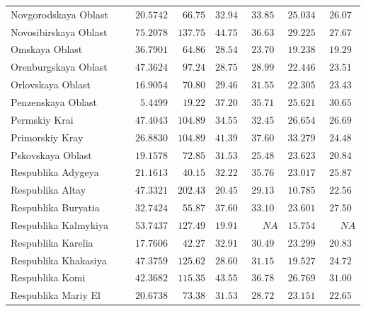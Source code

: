\documentclass[alpha-refs]{wiley-article-05g}
\begin{document}
{\begin{longtable}{lcccccc}
Novgorodskaya Oblast  & $\phantom{0}\phantom{-}20.5742$ & $\phantom{0}66.75$ & $32.94$ & $33.85$ & $25.034$ & $26.07$ \\
Novosibirskaya Oblast  & $\phantom{0}\phantom{-}75.2078$ & $137.75$ & $44.75$ & $36.63$ & $29.225$ & $27.67$ \\
Omskaya Oblast  & $\phantom{0}\phantom{-}36.7901$ & $\phantom{0}64.86$ & $28.54$ & $23.70$ & $19.238$ & $19.29$ \\
Orenburgskaya Oblast  & $\phantom{0}\phantom{-}47.3624$ & $\phantom{0}97.24$ & $28.75$ & $28.99$ & $22.446$ & $23.51$ \\
Orlovskaya Oblast  & $\phantom{0}\phantom{-}16.9054$ & $\phantom{0}70.80$ & $29.46$ & $31.55$ & $22.305$ & $23.43$ \\
Penzenskaya Oblast  & $\phantom{00}\phantom{-}5.4499$ & $\phantom{0}19.22$ & $37.20$ & $35.71$ & $25.621$ & $30.65$ \\
Permskiy Krai  & $\phantom{0}\phantom{-}47.4043$ & $104.89$ & $34.55$ & $32.45$ & $26.654$ & $26.69$ \\
Primorskiy Kray  & $\phantom{0}\phantom{-}26.8830$ & $104.89$ & $41.39$ & $37.60$ & $33.279$ & $24.48$ \\
Pskovskaya Oblast  & $\phantom{0}\phantom{-}19.1578$ & $\phantom{0}72.85$ & $31.53$ & $25.48$ & $23.623$ & $20.84$ \\
Respublika Adygeya  & $\phantom{0}\phantom{-}21.1613$ & $\phantom{0}40.15$ & $32.22$ & $35.76$ & $23.017$ & $25.87$ \\
Respublika Altay  & $\phantom{0}\phantom{-}47.3321$ & $202.43$ & $20.45$ & $29.13$ & $10.785$ & $22.56$ \\
Respublika Buryatia  & $\phantom{0}\phantom{-}32.7424$ & $\phantom{0}55.87$ & $37.60$ & $33.10$ & $23.601$ & $27.50$ \\
Respublika Kalmykiya  & $\phantom{0}\phantom{-}53.7437$ & $127.49$ & $19.91$ & $\phantom{000}NA$ & $15.754$ & $\phantom{000}NA$ \\
Respublika Karelia  & $\phantom{0}\phantom{-}17.7606$ & $\phantom{0}42.27$ & $32.91$ & $30.49$ & $23.299$ & $20.83$ \\
Respublika Khakasiya  & $\phantom{0}\phantom{-}47.3759$ & $125.62$ & $28.60$ & $31.15$ & $19.527$ & $24.72$ \\
Respublika Komi  & $\phantom{0}\phantom{-}42.3682$ & $115.35$ & $43.55$ & $36.78$ & $26.769$ & $31.00$ \\
Respublika Mariy El  & $\phantom{0}\phantom{-}20.6738$ & $\phantom{0}73.38$ & $31.53$ & $28.72$ & $23.151$ & $22.65$ \\

\end{longtable}}
\end{document}
